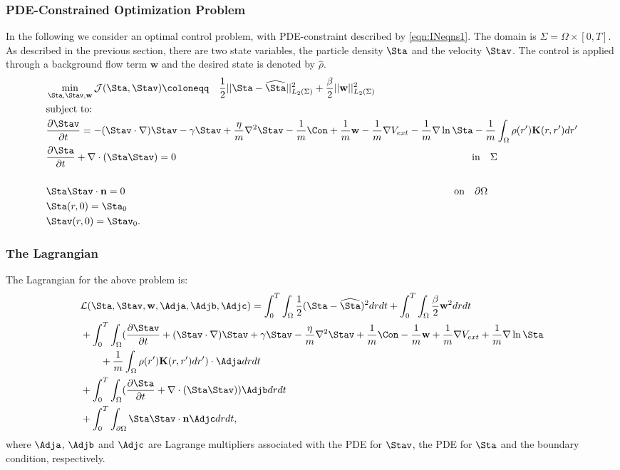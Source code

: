 
\subsubsection{PDE-Constrained Optimization Problem}
In the following we consider an optimal control problem, with PDE-constraint described by \eqref{eqn:INeqns1}. 
The domain is $\Sigma=\Omega \times [0,T]$. As described in the previous section, there are two state variables, the particle density $\Sta$ and the velocity $\Stav$. The control is applied through a background flow term $\mathbf{w}$ and the desired state is denoted by $\widehat \rho$. 
\begin{align*}
&\min_{\Sta,\Stav,\mathbf{w} } \mathcal J(\Sta,\Stav) \coloneqq \quad \frac{1}{2}||\Sta - \widehat \Sta||_{L_2(\Sigma)}^2  +\frac{\beta}{2}||\mathbf{w}||_{L_2(\Sigma)}^2\\
&\text{subject to:}\\
& \frac{\partial \Stav}{\partial t}= -  (\Stav \cdot \nabla)\Stav - \gamma  \Stav + \frac{\eta}{m} \nabla^2 \Stav  -\frac{1}{m}\Con +\frac{1}{m}\mathbf{w} -\frac{1}{m} \nabla V_{ext} - \frac{1}{m}\nabla \ln \Sta  -\frac{1}{m}\int_\Omega \rho(r') \mathbf{K}(r,r')dr' \\
&\frac{\partial \Sta}{\partial t} + \nabla \cdot (\Sta \Stav)=0 \qquad\qquad \qquad\qquad\qquad\quad \quad\quad\qquad \qquad\qquad \qquad\qquad\qquad\quad \qquad\quad\ \ \text{in} \quad \Sigma\\
\\
&\Sta \Stav \cdot \mathbf{n} =0\qquad\qquad \qquad\qquad\qquad\qquad\qquad\qquad\qquad \qquad\qquad \qquad\qquad\qquad \qquad\qquad\quad  \text{on} \quad \partial  \Omega\\
& \Sta(r,0)=\Sta_0\\
& \Stav(r,0)=\Stav_0.
\end{align*}

\subsubsection*{The Lagrangian}
The Lagrangian for the above problem is:
\begin{align*}
&\mathcal{L}(\Sta,\Stav,\mathbf{w},\Adja,\Adjb,\Adjc) = \int_0^T \int_\Omega  \frac{1}{2}(\Sta - \widehat \Sta)^2 drdt  +\int_0^T \int_\Omega  \frac{\beta}{2}\mathbf{w}^2 drdt\\
&+ \int_0^T \int_\Omega (\frac{\partial \Stav}{\partial t}+  (\Stav \cdot \nabla)\Stav + \gamma  \Stav - \frac{\eta}{m} \nabla^2 \Stav  +\frac{1}{m}\Con -\frac{1}{m}\mathbf{w} +\frac{1}{m} \nabla V_{ext} + \frac{1}{m}\nabla \ln \Sta  \\
&\quad \quad +\frac{1}{m}\int_\Omega \rho(r') \mathbf{K}(r,r')dr') \cdot \Adja dr dt\\
& + \int_0^T \int_\Omega (\frac{\partial \Sta}{\partial t} + \nabla \cdot (\Sta \Stav)) \Adjb dr dt\\ 
& +\int_0^T \int_{\partial\Omega} \Sta \Stav \cdot \mathbf{n} \Adjc dr dt,
\end{align*}
where $\Adja$, $\Adjb$ and $\Adjc$ are Lagrange multipliers associated with the PDE for $\Stav$, the PDE for $\Sta$ and the boundary condition, respectively.


